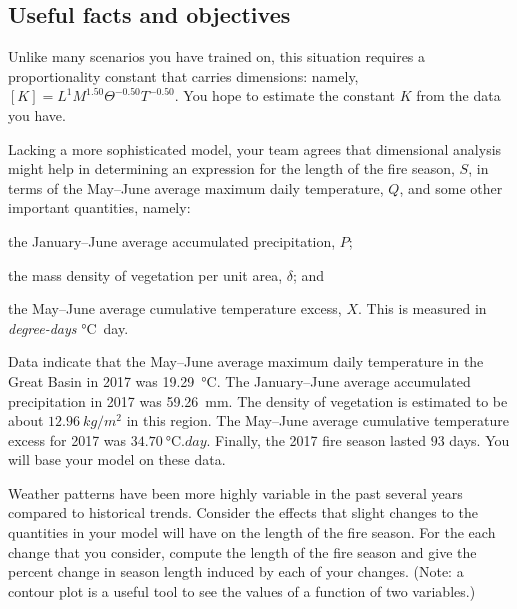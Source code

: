 \documentclass[11pt]{article}\usepackage[]{graphicx}\usepackage[]{color}
\begin{document}
\subsection*{Useful facts and objectives}

    \begin{compactitem}

        \item Unlike many scenarios you have trained on, this situation
        requires a proportionality constant that carries dimensions: namely,
        $[K] = L^{1} M^{1.50} \Theta^{-0.50} T^{-0.50}$.
        You hope to estimate the constant $K$ from the data you have.

        \item Lacking a more sophisticated model, your team agrees that
        dimensional analysis might help in determining an expression for the
        length of the fire season, $S$, in terms of the May--June average
        maximum daily temperature, $Q$, and some other important quantities,
        namely:
        \begin{compactenum}
            \item the January--June average accumulated precipitation, $P$;
            \item the mass density of vegetation per unit area, $\delta$; and
            \item the May--June average cumulative temperature excess, $X$. This
            is measured in \emph{degree-days} \si{\celsius.day}.
        \end{compactenum}

        \item Data indicate that the May--June average maximum daily temperature in
        the Great Basin in 2017 was
        \SI{19.29}{\celsius}. The January--June average
        accumulated precipitation in 2017 was
        \SI{59.26}{mm}. The density of vegetation is
        estimated to be about $\SI{12.96}{kg/m^2}$ in this region.
        The May--June average cumulative temperature excess for 2017 was
        $\SI{34.70}{\celsius.day}$. Finally, the 2017 fire season
        lasted $\num{93}$ days. You will base your model on these
        data.

        \item Weather patterns have been more highly variable in the past several years
        compared to historical trends. Consider the effects that slight changes to the
        quantities in your model will have on the length of the fire season. For the
        each change that you consider, compute the length of the fire season and give the
        percent change in season length induced by each of your changes. (Note: a contour
        plot is a useful tool to see the values of a function of two variables.)

    \end{compactitem}
\end{document}
